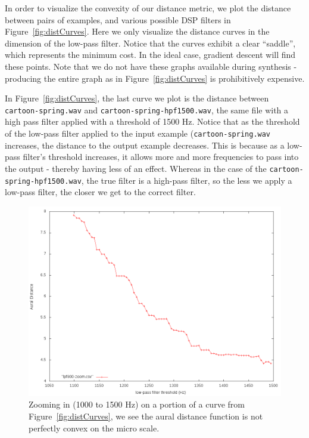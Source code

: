 In order to visualize the convexity of our distance metric, we plot the distance between pairs of examples, and various possible DSP filters in Figure~\ref{fig:distCurves}.
Here we only visualize the distance curves in the dimension of the low-pass filter.
Notice that the curves exhibit a clear ``saddle'', which represents the minimum cost.
In the ideal case, gradient descent will find these points.
Note that we do not have these graphs available during synthesis - producing the entire graph as in Figure~\ref{fig:distCurves} is prohibitively expensive.

In Figure~\ref{fig:distCurves}, the last curve we plot is the distance between \texttt{cartoon-spring.wav} and \texttt{cartoon-spring-hpf1500.wav}, the same file with a high pass filter applied with a threshold of 1500 Hz.
Notice that as the threshold of the low-pass filter applied to the input example (\texttt{cartoon-spring.wav} increases, the distance to the output example decreases. 
This is because as a low-pass filter's threshold increases, it allows more and more frequencies to pass into the output - thereby having less of an effect.
Whereas in the case of the \texttt{cartoon-spring-hpf1500.wav}, the true filter is a high-pass filter, so the less we apply a low-pass filter, the closer we get to the correct filter.

\begin{figure}[!h]
\includegraphics[width=\columnwidth]{figs/distCurveZoom} 
\caption{Zooming in (1000 to 1500 Hz) on a portion of a curve from Figure~\ref{fig:distCurves}, we see the aural distance function is not perfectly convex on the micro scale.}
\label{fig:microDist}
\end{figure}

